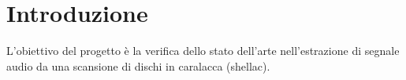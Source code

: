 \section{Introduzione}
L'obiettivo del progetto \`e la verifica dello stato dell'arte
nell'estrazione di segnale audio da una scansione di dischi
in caralacca (shellac).

% 
% 
